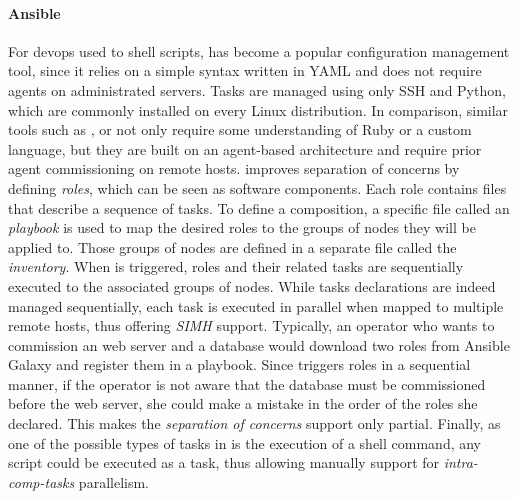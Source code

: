 \paragraph{Ansible}
For devops used to shell scripts, \ansible has become a popular
configuration management tool, since it relies on a simple syntax
written in YAML and does not require agents on administrated
servers. Tasks are managed using only SSH and Python, which are
commonly installed on every Linux distribution. In comparison, similar
tools such as \chef, \puppet or \cfengine not only require some
understanding of Ruby or a custom language, but they are built on an
agent-based architecture and require prior agent commissioning on
remote hosts. \ansible improves separation of concerns by defining
\emph{roles}, which can be seen as software components. Each role
contains files that describe a sequence of tasks. To define a
composition, a specific file called an \ansible \emph{playbook} is
used to map the desired roles to the groups of nodes they will be
applied to. Those groups of nodes are defined in a separate file
called the \emph{inventory}. When \ansible is triggered, roles and
their related tasks are sequentially executed to the associated groups
of nodes. While tasks declarations are indeed managed sequentially,
each task is executed in parallel when mapped to multiple remote
hosts, thus offering \emph{SIMH} support. Typically, an operator who
wants to commission an \apache web server and a \mysql database would
download two roles from Ansible Galaxy and register them in a
playbook. Since \ansible triggers roles in a sequential manner, if the
operator is not aware that the database must be commissioned before
the web server, she could make a mistake in the order of the roles she
declared. This makes the \emph{separation of concerns} support only
partial. Finally, as one of the possible types of tasks in \ansible is
the execution of a shell command, any script could be executed as a
task, thus allowing manually support for \emph{intra-comp-tasks}
parallelism.


